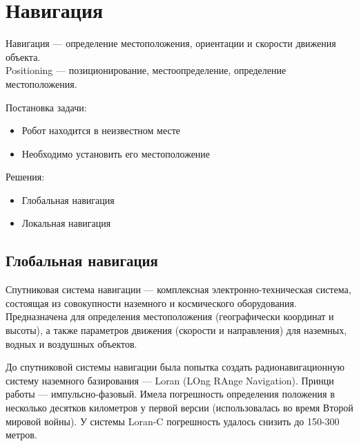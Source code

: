\documentclass{article}
\begin{document}
\begin{sloppypar}
    \section{Навигация}

    Навигация — определение местоположения, ориентации и скорости движения объекта. \\
    Positioning — позиционирование, местоопределение, определение местоположения.

    Постановка задачи:
    \begin{itemize}
        \item Робот находится в неизвестном месте
        \item Необходимо установить его местоположение
    \end{itemize}

    Решения:
    \begin{itemize}
        \item Глобальная навигация
        \item Локальная навигация
    \end{itemize}

    \subsection{Глобальная навигация}

    Спутниковая система навигации — комплексная электронно-техническая система, состоящая из совокупности наземного и космического оборудования. Предназначена для определения местоположения (географически координат и высоты), а также параметров движения (скорости и направления) для наземных, водных и воздушных объектов.

    До спутниковой системы навигации была попытка создать радионавигационную систему наземного базирования — Loran (LOng RAnge Navigation). Принци работы — импульсно-фазовый. Имела погрешность определения положения в несколько десятков километров у первой версии (использовалась во время Второй мировой войны). У системы Loran-C погрешность удалось снизить до 150-300 метров.
\end{sloppypar}
\end{document}
